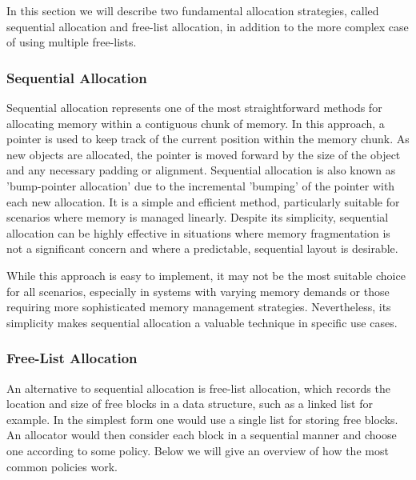 
In this section we will describe two fundamental allocation strategies, called sequential allocation and free-list allocation, in addition to the more complex case of using multiple free-lists.

\subsubsection{Sequential Allocation}

Sequential allocation represents one of the most straightforward methods for allocating memory within a contiguous chunk of memory. In this approach, a pointer is used to keep track of the current position within the memory chunk. As new objects are allocated, the pointer is moved forward by the size of the object and any necessary padding or alignment. Sequential allocation is also known as 'bump-pointer allocation' due to the incremental 'bumping' of the pointer with each new allocation. It is a simple and efficient method, particularly suitable for scenarios where memory is managed linearly. Despite its simplicity, sequential allocation can be highly effective in situations where memory fragmentation is not a significant concern and where a predictable, sequential layout is desirable.

While this approach is easy to implement, it may not be the most suitable choice for all scenarios, especially in systems with varying memory demands or those requiring more sophisticated memory management strategies. Nevertheless, its simplicity makes sequential allocation a valuable technique in specific use cases.

\subsubsection{Free-List Allocation}
An alternative to sequential allocation is free-list allocation, which records the location and size of free blocks in a data structure, such as a linked list for example. In the simplest form one would use a single list for storing free blocks. An allocator would then consider each block in a sequential manner and choose one according to some policy. Below we will give an overview of how the most common policies work.

